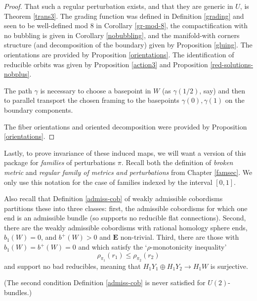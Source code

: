 \documentclass[10pt,a4paper]{amsart}
\theoremstyle{definition}
\theoremstyle{remark}
\numberwithin{figure}{qchap}
\begin{document}
\begin{proof}That such a regular perturbation exists, and that they are generic in $U$, is Theorem \ref{trans3}. The grading function was defined in Definition \ref{grading} and seen to be well-defined mod 8 in Corollary \ref{gr-mod-8}, the compactification with no bubbling is given in Corollary \ref{nobubbling}, and the manifold-with corners structure (and decomposition of the boundary) given by Proposition \ref{gluing}. The orientations are provided by Proposition \ref{orientations}. The identification of reducible orbits was given by Proposition \ref{action3} and Proposition \ref{red-solutions-nobplus}.

The path $\gamma$ is necessary to choose a basepoint in $W$ (as $\gamma(1/2)$, say) and then to parallel transport the chosen framing to the basepoints $\gamma(0), \gamma(1)$ on the boundary components.

The fiber orientations and oriented decomposition were provided by Proposition \ref{orientations}.
\end{proof}

Lastly, to prove invariance of these induced maps, we will want a version of this package for \emph{families} of perturbations $\pi$. Recall both the definition of \emph{broken metric} and \emph{regular family of metrics and perturbations} from Chapter \ref{famsec}. We only use this notation for the case of families indexed by the interval $[0,1]$. 

Also recall that Definition \ref{admiss-cob} of weakly admissible cobordisms partitions these into three classes: first, the admissible cobordisms for which one end is an admissible bundle (so supports no reducible flat connections). Second, there are the weakly admissible cobordisms with rational homology sphere ends, $b_1(W) = 0$, and $b^+(W) > 0$ and $\mathbf{E}$ non-trivial. Third, there are those with $b_1(W) = b^+(W) = 0$ and which satisfy the `$\rho$-monotonicity inequality' 
$$\rho_{\pi_1}(r_1) \leq \rho_{\pi_2}(r_2)$$ and support no bad reducibles, meaning that $H_1 Y_1 \oplus H_1 Y_2 \to H_1 W$ is surjective.

(The second condition Definition \ref{admiss-cob} is never satisfied for $U(2)$-bundles.)
\end{document}
